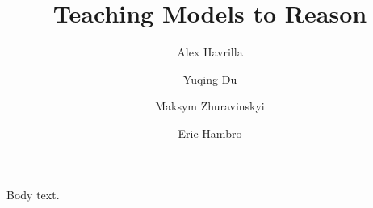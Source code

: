 \documentclass{fairmeta}
\title{Teaching Models to Reason}
\author[1,2,*]{Alex Havrilla}
\author[4]{Yuqing Du}
\author[3]{Maksym Zhuravinskyi}
\author[1,**]{Eric Hambro}
\affiliation[1]{Meta}
\affiliation[2]{Georgia Institute of Technology}
\affiliation[3]{StabilityAI}
\affiliation[4]{UC Berkeley}
\begin{document}
\maketitle
Body text.
\end{document}

